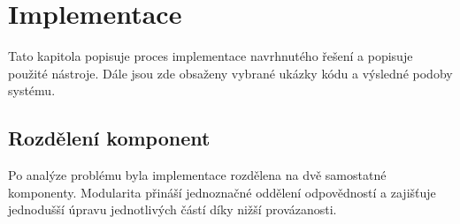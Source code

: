 \chapter{Implementace}

Tato kapitola popisuje proces implementace navrhnutého řešení a popisuje použité nástroje.
Dále jsou zde obsaženy vybrané ukázky kódu a výsledné podoby systému.

\section{Rozdělení komponent}

Po analýze problému byla implementace rozdělena na dvě samostatné komponenty. Modularita
přináší jednoznačné oddělení odpovědností a zajišťuje jednodušší úpravu jednotlivých částí
díky nižší provázanosti.










